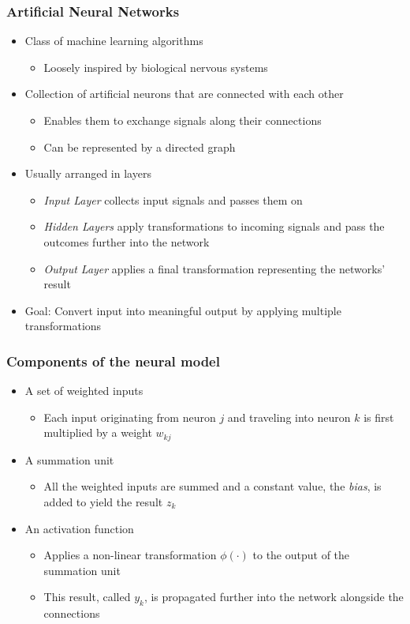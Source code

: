 \begin{frame}
  \frametitle{Artificial Neural Networks}
  \begin{itemize}
    \item Class of machine learning algorithms
      \begin{itemize}
        \item Loosely inspired by biological nervous systems
      \end{itemize}
    \item Collection of artificial neurons that are connected with
      each other
      \begin{itemize}
        \item Enables them to exchange signals along their connections
        \item Can be represented by a directed graph
      \end{itemize}
    \item Usually arranged in layers
      \begin{itemize}
        \item \textit{Input Layer} collects input signals and passes
          them on
        \item \textit{Hidden Layers} apply transformations to incoming
          signals and pass the outcomes further into the network
        \item \textit{Output Layer} applies a final transformation
          representing the networks' result
      \end{itemize}
    \item Goal: Convert input into meaningful output by applying
      multiple transformations
  \end{itemize}
\end{frame}

\begin{frame}
  \frametitle{Components of the neural model}
  \begin{itemize}
   \item A set of weighted inputs
     \begin{itemize}
       \item Each input originating from neuron \(j\) and traveling
         into neuron \(k\) is first multiplied by a weight \(w_{kj}\)
     \end{itemize}
   \item A summation unit
     \begin{itemize}
       \item All the weighted inputs are summed and a constant value,
         the \textit{bias}, is added to yield the result \(z_k\)
     \end{itemize}
   \item An activation function
     \begin{itemize}
       \item Applies a non-linear transformation \(\phi(\cdot)\) to
         the output of the summation unit
       \item This result, called \(y_k\), is propagated further into
         the network alongside the connections
     \end{itemize}
  \end{itemize}
\end{frame}

